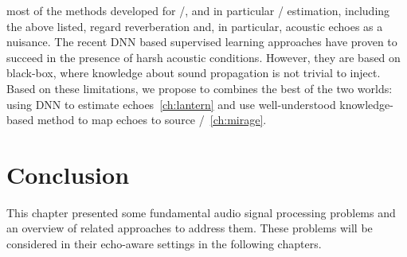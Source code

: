  most of the methods developed for \SSL/, and in particular \DOAs/ estimation, including the above listed, regard reverberation and, in particular, acoustic echoes as a nuisance.
The recent \ac{DNN} based supervised learning approaches have proven to succeed in the presence of harsh acoustic conditions.
However, they are based on black-box, where knowledge about sound propagation is not trivial to inject.
Based on these limitations, we propose to combines the best of the two worlds:
using \ac{DNN} to estimate echoes~\cref{ch:lantern} and use well-understood knowledge-based method to map echoes to source \DOAs/~\cref{ch:mirage}.







\section{Conclusion}\label{sec:application:conclusion}
This chapter presented some fundamental audio signal processing problems and an overview of related approaches to address them.
These problems will be considered in their echo-aware settings in the following chapters.

